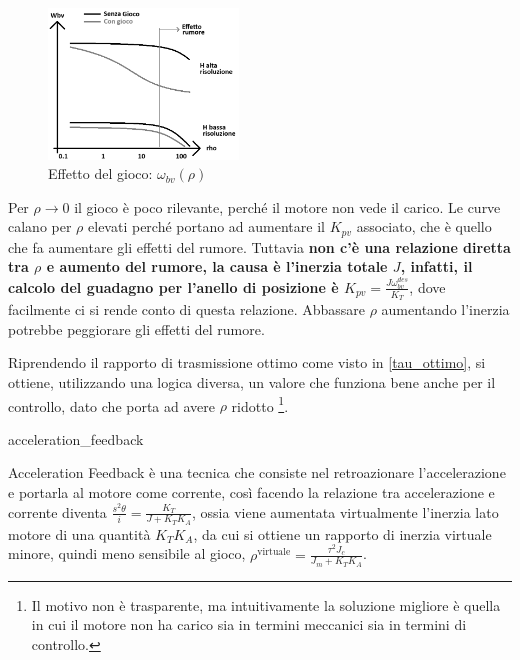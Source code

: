 \begin{figure}[h]
    \centering
    \includegraphics[width=0.45\textwidth]{Immagini/gioco_banda_passante_rho.png}
    \caption{Effetto del gioco: \(\omega_{bv}(\rho)\)}
\end{figure}

Per \(\rho \rightarrow 0\) il gioco è poco rilevante, perché il motore non vede il carico. Le curve calano per \(\rho\) elevati perché portano ad aumentare il \(K_{pv}\) associato, che è quello che fa aumentare gli effetti del rumore. Tuttavia \textbf{non c'è una relazione diretta tra \(\rho\) e aumento del rumore, la causa è l'inerzia totale \(J\), infatti, il calcolo del guadagno per l'anello di posizione è \(K_{pv} = \frac{J \omega_{bv}^{des}}{K_T}\)}, dove facilmente ci si rende conto di questa relazione. Abbassare \(\rho\) aumentando l'inerzia potrebbe peggiorare gli effetti del rumore.

Riprendendo il rapporto di trasmissione ottimo come visto in \ref{tau_ottimo}, si ottiene, utilizzando una logica diversa, un valore che funziona bene anche per il controllo, dato che porta ad avere \(\rho\) ridotto \footnote{Il motivo non è trasparente, ma intuitivamente la soluzione migliore è quella in cui il motore non ha carico sia in termini meccanici sia in termini di controllo.}.


{acceleration_feedback}

Acceleration Feedback è una tecnica che consiste nel retroazionare l'accelerazione e portarla al motore come corrente, così facendo la relazione tra accelerazione e corrente diventa \(\frac{s^2\theta}{i} = \frac{K_T}{J + K_TK_A}\), ossia viene aumentata virtualmente l'inerzia lato motore di una quantità \(K_TK_A\), da cui si ottiene un rapporto di inerzia virtuale minore, quindi meno sensibile al gioco, \(\rho^\text{virtuale}=\frac{\tau^2 J_c}{J_m + K_TK_A}\).


